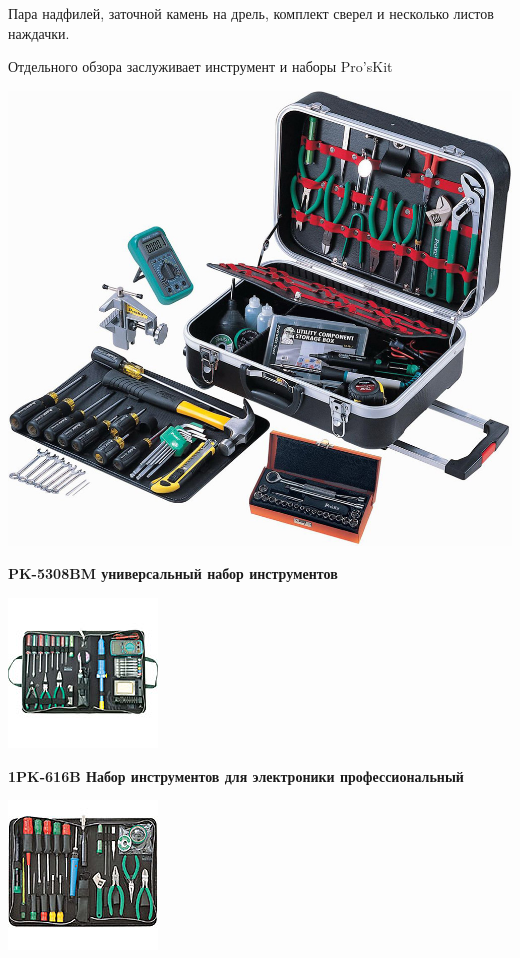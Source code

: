 \secdown

Пара надфилей, заточной камень на дрель, комплект сверел и несколько листов
наждачки.

Отдельного обзора заслуживает инструмент и наборы Pro'sKit

\clearpage
\noindent\includegraphics[height=0.95\textheight]{tech/tools/proskit/PK5308BM.jpg}

\textbf{PK-5308BM универсальный набор инструментов}

\clearpage
\noindent\includegraphics[height=0.95\textheight]{tech/tools/proskit/1PK-616B.jpg}

\textbf{1PK-616B Набор инструментов для электроники профессиональный}

\clearpage\label{1PK-813B}
\noindent\includegraphics[height=0.95\textheight]{tech/tools/proskit/1PK-813B.jpg}

